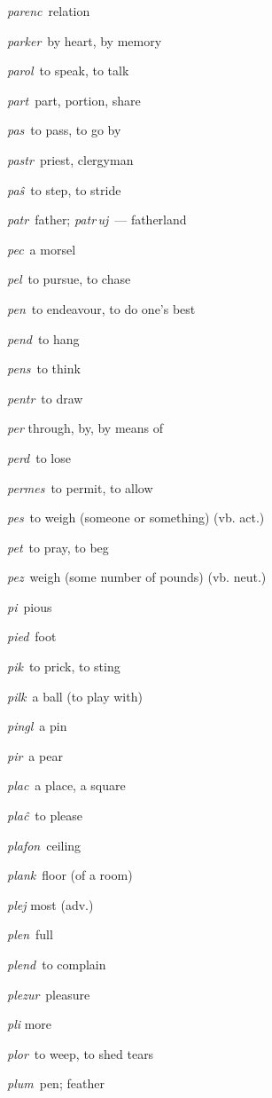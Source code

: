 \begin{landscape}
\begin{multicols}{5}
\begin{outdent}{1em}
\emph{parenc\,} relation

\emph{parker\,} by heart, by memory

\emph{parol\,} to speak, to talk

\emph{part\,} part, portion, share

\emph{pas\,} to pass, to go by

\emph{pastr\,} priest, clergyman

\emph{paŝ\,} to step, to stride

\emph{patr\,} father; \emph{patr\,uj\,} — fatherland

\emph{pec\,} a morsel

\emph{pel\,} to pursue, to chase

\emph{pen\,} to endeavour, to do one’s best

\emph{pend\,} to hang

\emph{pens\,} to think

\emph{pentr\,} to draw

\emph{per} through, by, by means of 

\emph{perd\,} to lose

\emph{permes\,} to permit, to allow

\emph{pes\,} to weigh (someone or something) (vb. act.)

\emph{pet\,} to pray, to beg

\emph{pez\,} weigh (some number of pounds) (vb. neut.)

\emph{pi\,} pious

\emph{pied\,} foot

\emph{pik\,} to prick, to sting

\emph{pilk\,} a ball (to play with)

\emph{pingl\,} a pin

\emph{pir\,} a pear

\emph{plac\,} a place, a square

\emph{plaĉ\,} to please

\emph{plafon\,} ceiling

\emph{plank\,} floor (of a room)

\emph{plej} most (adv.)

\emph{plen\,} full

\emph{plend\,} to complain

\emph{plezur\,} pleasure

\emph{pli} more

\emph{plor\,} to weep, to shed tears

\emph{plum\,} pen; feather


\end{outdent}
\end{multicols}
\end{landscape}
